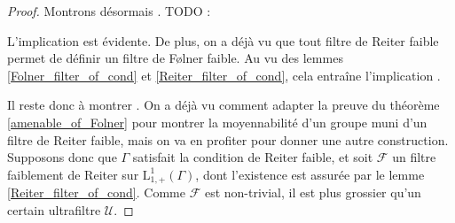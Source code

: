 \documentclass[a4paper,12pt]{article}
\renewcommand{\implies}{\Rightarrow}
\newcommand{\TODO}[1]{{\color{red}TODO :} #1}
\begin{document}
\begin{proof}
    Montrons désormais \framebox{$(\ref{amenable_TFAE/strong_Reiter})\implies(\ref{amenable_TFAE/strong_Folner})$}. \TODO{}

    L'implication \framebox{$(\ref{amenable_TFAE/strong_Folner})\implies(\ref{amenable_TFAE/weak_Folner})$} est évidente.
    De plus, on a déjà vu que tout filtre de Reiter faible permet de définir un filtre de F\o{}lner faible. Au vu des lemmes 
    \ref{Folner_filter_of_cond} et \ref{Reiter_filter_of_cond}, cela entraîne l'implication 
    \framebox{$(\ref{amenable_TFAE/weak_Folner})\implies(\ref{amenable_TFAE/weak_Reiter})$}. 

    Il reste donc à montrer \framebox{$(\ref{amenable_TFAE/weak_Reiter})\implies(\ref{amenable_TFAE/amenable})$}. On a déjà vu comment 
    adapter la preuve du théorème \ref{amenable_of_Folner} pour montrer la moyennabilité d'un groupe muni d'un filtre de Reiter 
    faible, mais on va en profiter pour donner une autre construction. Supposons donc que $\Gamma$ satisfait la condition de Reiter faible,
    et soit $\mathscr{F}$ un filtre faiblement de Reiter sur $\mathrm{L}^1_{1, +}(\Gamma)$, dont l'existence est assurée par le lemme
    \ref{Reiter_filter_of_cond}. Comme $\mathscr{F}$ est non-trivial, il est plus grossier qu'un certain ultrafiltre $\mathscr{U}$. 


\end{proof}
\end{document}
